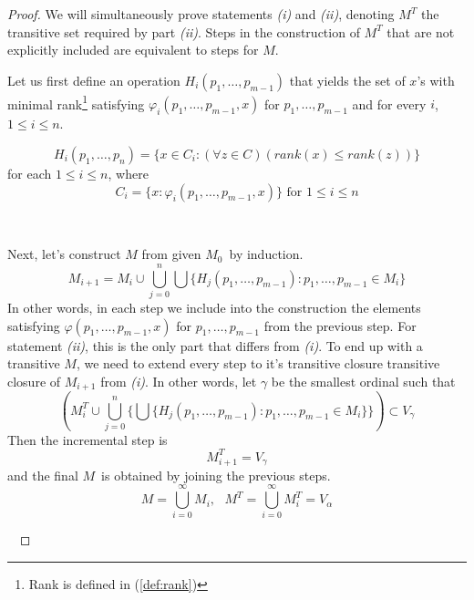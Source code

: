 \begin{proof}
We will simultaneously prove statements \emph{(i)} and \emph{(ii)}, denoting $M^T$ the transitive set required by part \emph{(ii)}.
Steps in the construction of $M^T$ that are not explicitly included are equivalent to steps for $M$.

Let us first define an operation $H_i(p_1, \ldots, p_{m-1})$ that yields the set of $x$'s with minimal rank\footnote{Rank is defined in (\ref{def:rank})} satisfying $\varphi_i(p_1, \ldots, p_{m-1}, x)$ for $p_1, \ldots, p_{m-1}$ and for every $i$, $1 \leq i \leq n$.

\begin{equation}
H_i(p_1, \ldots, p_n) = \{x \in C_i: (\forall z \in C)(rank(x) \leq rank(z))\}
\end{equation}
for each $1 \leq i \leq n$, where
\begin{equation}
C_i = \{x: \varphi_i(p_1, \ldots, p_{m-1}, x)\} \mbox{ for $1 \leq i \leq n$}
\end{equation}

\

Next, let's construct $M$ from given $M_0$ by induction. 
\begin{equation}
M_{i+1} = M_i \cup \bigcup_{j=0}^{n} \bigcup \{H_j(p_1, \ldots, p_{m-1}): p_1, \ldots, p_{m-1} \in M_i\}
\end{equation}
In other words, in each step we include into the construction the elements satisfying $\varphi(p_1, \ldots, p_{m-1}, x)$ for $p_1, \ldots, p_{m-1}$ from the previous step.
For statement \emph{(ii)}, this is the only part that differs from \emph{(i)}. To end up with a transitive $M$, we need to extend every step to it's transitive closure transitive closure of $M_{i+1}$ from \emph{(i)}. In other words, let $\gamma$ be the smallest ordinal such that 
\begin{equation}
(M^T_i \cup \bigcup_{j=0}^{n} \{\bigcup\{H_j(p_1, \ldots, p_{m-1}): p_1, \ldots, p_{m-1} \in M_i\}\}) \subset V_\gamma
\end{equation}
Then the incremental step is
\begin{equation}
M^T_{i+1} = V_\gamma
\end{equation}
and the final $M$ is obtained by joining the previous steps.
\begin{equation}
M = \bigcup_{i=0}^{\infty} M_i, \mbox{  }M^T = \bigcup_{i=0}^{\infty} M^T_i = V_\alpha
\end{equation}

\


\end{proof}
